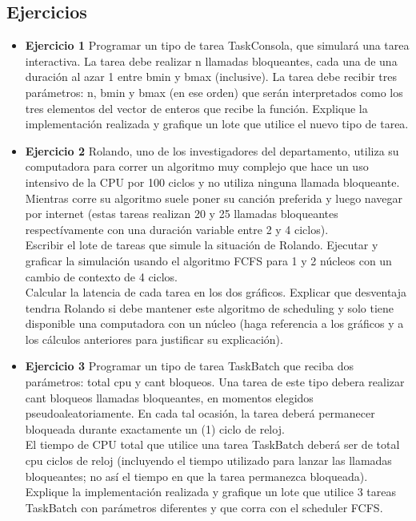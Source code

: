 
\subsection{Ejercicios}
\begin{itemize}
 \item \textbf{Ejercicio 1 } Programar un tipo de tarea TaskConsola, que simular\'{a} una tarea interactiva.
La tarea debe realizar n llamadas bloqueantes, cada una de una duraci\'{o}n al azar 1 entre bmin
y bmax (inclusive). La tarea debe recibir tres par\'{a}metros: n, bmin y bmax (en ese orden)
que ser\'{a}n interpretados como los tres elementos del vector de enteros que recibe la funci\'{o}n.
Explique la implementaci\'{o}n realizada y grafique un lote que utilice el nuevo tipo de tarea.
\item \textbf{Ejercicio 2} Rolando, uno de los investigadores del departamento, utiliza su computadora
para correr un algoritmo muy complejo que hace un uso intensivo de la CPU por 100 ciclos
y no utiliza ninguna llamada bloqueante. Mientras corre su algoritmo suele poner su canci\'{o}n
preferida y luego navegar por internet (estas tareas realizan 20 y 25 llamadas bloqueantes
respect\'{i}vamente con una duraci\'{o}n variable entre 2 y 4 ciclos).\\
Escribir el lote de tareas que simule la situaci\'{o}n de Rolando. Ejecutar y graficar la simulaci\'{o}n
usando el algoritmo FCFS para 1 y 2 n\'{u}cleos con un cambio de contexto de 4 ciclos.\\
Calcular la latencia de cada tarea en los dos gr\'{a}ficos. Explicar que desventaja tendrıa Rolando
si debe mantener este algoritmo de scheduling y solo tiene disponible una computadora con un
n\'{u}cleo (haga referencia a los gr\'{a}ficos y a los c\'{a}lculos anteriores para justificar su explicaci\'{o}n).
\item \textbf{Ejercicio 3} Programar un tipo de tarea TaskBatch que reciba dos par\'{a}metros: total cpu y
cant bloqueos. Una tarea de este tipo debera realizar cant bloqueos llamadas bloqueantes, en
momentos elegidos pseudoaleatoriamente. En cada tal ocasi\'{o}n, la tarea deber\'{a} permanecer
bloqueada durante exactamente un (1) ciclo de reloj. \\
El tiempo de CPU total que utilice una
tarea TaskBatch deber\'{a} ser de total cpu ciclos de reloj (incluyendo el tiempo utilizado para
lanzar las llamadas bloqueantes; no as\'{i} el tiempo en que la tarea permanezca bloqueada).
Explique la implementaci\'{o}n realizada y grafique un lote que utilice 3 tareas TaskBatch con
par\'{a}metros diferentes y que corra con el scheduler FCFS.
\end{itemize}

